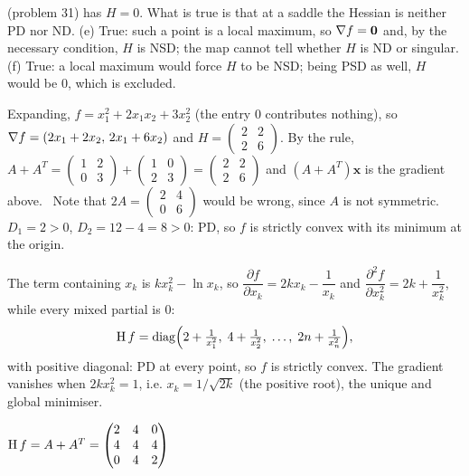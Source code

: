 \begin{solutions}
        (problem 31) has $H=0$. What is true is that at a saddle the
        Hessian is neither PD nor ND. (e) True: such a point is a local
        maximum, so $\nabla f=\mathbf{0}$ and, by the necessary condition,
        $H$ is NSD; the map cannot tell whether $H$ is ND or singular.
        (f) True: a local maximum would force $H$ to be NSD; being PSD as
        well, $H$ would be $0$, which is excluded.
  \item Expanding, $f=x_{1}^{2}+2x_{1}x_{2}+3x_{2}^{2}$ (the entry $0$
        contributes nothing), so $\nabla f=(2x_{1}+2x_{2},\,2x_{1}+6x_{2})$
        and $H=\begin{pmatrix}2&2\\2&6\end{pmatrix}$. By the rule,
        $A+A^{T}=\begin{pmatrix}1&2\\0&3\end{pmatrix}+\begin{pmatrix}1&0\\2&3
        \end{pmatrix}=\begin{pmatrix}2&2\\2&6\end{pmatrix}$ and
        $(A+A^{T})\mathbf{x}$ is the gradient above. \checkmark\ Note that
        $2A=\begin{pmatrix}2&4\\0&6\end{pmatrix}$ would be wrong, since $A$
        is not symmetric. $D_{1}=2>0$, $D_{2}=12-4=8>0$: PD, so $f$ is
        strictly convex with its minimum at the origin.
  \item The term containing $x_{k}$ is $kx_{k}^{2}-\ln x_{k}$, so
        $\dfrac{\partial f}{\partial x_{k}}=2kx_{k}-\dfrac1{x_{k}}$ and
        $\dfrac{\partial^{2}f}{\partial x_{k}^{2}}=2k+\dfrac{1}{x_{k}^{2}}$,
        while every mixed partial is $0$:
        \[
          \operatorname{H} f=\operatorname{diag}\Bigl(2+\tfrac{1}{x_{1}^{2}},\;
          4+\tfrac{1}{x_{2}^{2}},\;\ldots,\;2n+\tfrac{1}{x_{n}^{2}}\Bigr),
        \]
        with positive diagonal: PD at every point, so $f$ is strictly
        convex. The gradient vanishes when $2kx_{k}^{2}=1$, i.e.
        $x_{k}=1/\sqrt{2k}$ (the positive root), the unique and global
        minimiser.
  \item $\operatorname{H} f=A+A^{T}=\begin{pmatrix}2&4&0\\4&4&4\\0&4&2\end{pmatrix}$

\end{solutions}
